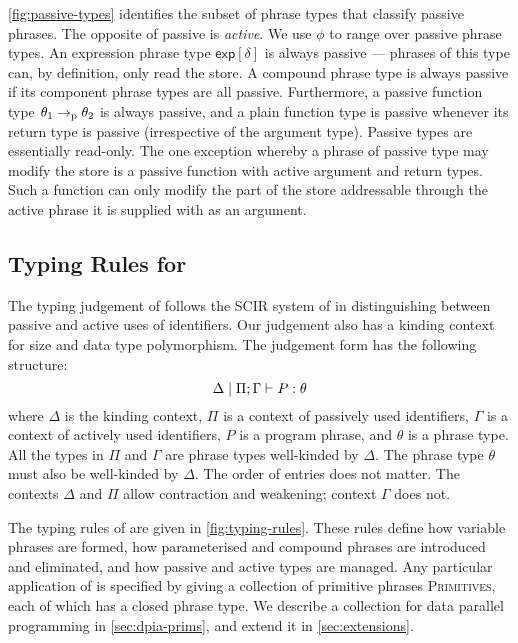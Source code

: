 \autoref{fig:passive-types} identifies the subset of phrase types that classify passive phrases. The opposite of passive is \emph{active}. We use $\phi$ to range over passive phrase types. An expression phrase type $\mathsf{exp}[\delta]$ is always passive --- phrases of this type can, by definition, only read the store. A compound phrase type is always passive if its component phrase types are all passive. Furthermore, a passive function type $\theta_1 \to_{\textrm{p}} \theta_2$ is always passive, and a plain function type is passive whenever its return type is passive (irrespective of the argument type).
%
Passive types are essentially read-only. The one exception whereby a phrase of passive type may modify the store is a passive function with active argument and return types. Such a function can only modify the part of the store addressable through the active phrase it is supplied with as an argument.

\subsection{Typing Rules for \DPIA}
\label{sec:typing-rules}

The typing judgement of \DPIA follows the SCIR system of \citet{OHearnPTT99} in distinguishing between passive and active uses of identifiers. Our judgement also has a kinding context for size and data type polymorphism. The judgement form has the following structure:
\begin{displaymath}
  \Delta \mid \Pi; \Gamma \vdash P : \theta
\end{displaymath}
where $\Delta$ is the kinding context, $\Pi$ is a context of passively used identifiers, $\Gamma$ is a context of actively used identifiers, $P$ is a program phrase, and $\theta$ is a phrase type. All the types in $\Pi$ and $\Gamma$ are phrase types well-kinded by $\Delta$. The phrase type $\theta$ must also be well-kinded by $\Delta$. The order of entries does not matter. The contexts $\Delta$ and $\Pi$ allow contraction and weakening; context $\Gamma$ does not.

The typing rules of \DPIA are given in \autoref{fig:typing-rules}. These rules define how variable phrases are formed, how parameterised and compound phrases are introduced and eliminated, and how passive and active types are managed. Any particular application of \DPIA is specified by giving a collection of primitive phrases \textsc{Primitives}, each of which has a closed phrase type. We describe a collection for data parallel programming in \autoref{sec:dpia-prims}, and extend it in \autoref{sec:extensions}.

